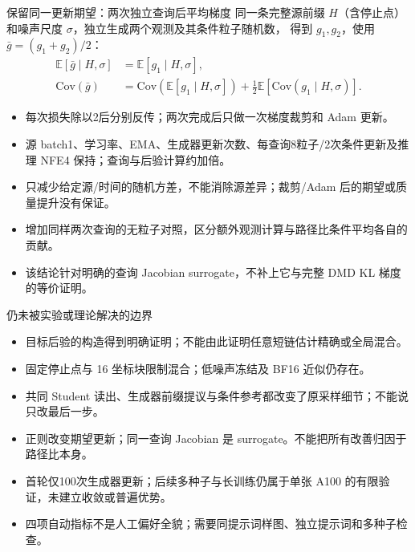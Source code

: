 \documentclass[10pt,aspectratio=169]{beamer}
\newcommand{\E}{\mathbb E}
\begin{document}
\begin{frame}{保留同一更新期望：两次独立查询后平均梯度}
\small
同一条完整源前缀 $H$（含停止点）和噪声尺度 $\sigma$，独立生成两个观测及其条件粒子随机数，
得到 $g_1,g_2$，使用 $\bar g=(g_1+g_2)/2$：
\begin{align}
\E[\bar g\mid H,\sigma]&=\E[g_1\mid H,\sigma],\\
\mathrm{Cov}(\bar g)&=\mathrm{Cov}(\E[g_1\mid H,\sigma])
+\tfrac12\E[\mathrm{Cov}(g_1\mid H,\sigma)].
\end{align}
\begin{itemize}\itemsep5pt
\item 每次损失除以2后分别反传；两次完成后只做一次梯度裁剪和 Adam 更新。
\item 源 batch1、学习率、EMA、生成器更新次数、每查询8粒子/2次条件更新及推理 NFE4 保持；查询与后验计算约加倍。
\item 只减少给定源/时间的随机方差，不能消除源差异；裁剪/Adam 后的期望或质量提升没有保证。
\item 增加同样两次查询的无粒子对照，区分额外观测计算与路径比条件平均各自的贡献。
\item 该结论针对明确的查询 Jacobian surrogate，不补上它与完整 DMD KL 梯度的等价证明。
\end{itemize}
\end{frame}
\begin{frame}{仍未被实验或理论解决的边界}
\small
\begin{itemize}\itemsep6pt
\item 目标后验的构造得到明确证明；不能由此证明任意短链估计精确或全局混合。
\item 固定停止点与 16 坐标块限制混合；低噪声冻结及 BF16 近似仍存在。
\item 共同 Student 读出、生成器前缀提议与条件参考都改变了原采样细节；不能说只改最后一步。
\item 正则改变期望更新；同一查询 Jacobian 是 surrogate。不能把所有改善归因于路径比本身。
\item 首轮仅100次生成器更新；后续多种子与长训练仍属于单张 A100 的有限验证，未建立收敛或普遍优势。
\item 四项自动指标不是人工偏好全貌；需要同提示词样图、独立提示词和多种子检查。
\end{itemize}
\end{frame}
\end{document}
